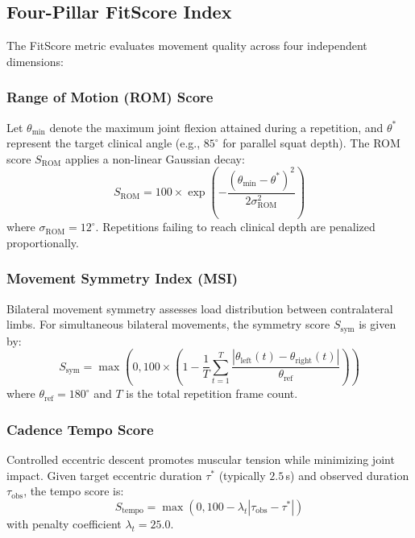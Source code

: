 \documentclass[conference]{IEEEtran}
\begin{document}
\subsection{Four-Pillar FitScore Index}
The FitScore metric evaluates movement quality across four independent dimensions:

\subsubsection{Range of Motion (ROM) Score}
Let $\theta_{\min}$ denote the maximum joint flexion attained during a repetition, and $\theta^*$ represent the target clinical angle (e.g., $85^\circ$ for parallel squat depth). The ROM score $S_{\text{ROM}}$ applies a non-linear Gaussian decay:
\begin{equation}
    S_{\text{ROM}} = 100 \times \exp\left(-\frac{(\theta_{\min} - \theta^*)^2}{2\sigma_{\text{ROM}}^2}\right)
\end{equation}
where $\sigma_{\text{ROM}} = 12^\circ$. Repetitions failing to reach clinical depth are penalized proportionally.

\subsubsection{Movement Symmetry Index (MSI)}
Bilateral movement symmetry assesses load distribution between contralateral limbs. For simultaneous bilateral movements, the symmetry score $S_{\text{sym}}$ is given by:
\begin{equation}
    S_{\text{sym}} = \max\left(0, 100 \times \left(1 - \frac{1}{T} \sum_{t=1}^T \frac{|\theta_{\text{left}}(t) - \theta_{\text{right}}(t)|}{\theta_{\text{ref}}}\right)\right)
\end{equation}
where $\theta_{\text{ref}} = 180^\circ$ and $T$ is the total repetition frame count.

\subsubsection{Cadence Tempo Score}
Controlled eccentric descent promotes muscular tension while minimizing joint impact. Given target eccentric duration $\tau^*$ (typically $2.5$\,s) and observed duration $\tau_{\text{obs}}$, the tempo score is:
\begin{equation}
    S_{\text{tempo}} = \max\left(0, 100 - \lambda_t |\tau_{\text{obs}} - \tau^*|\right)
\end{equation}
with penalty coefficient $\lambda_t = 25.0$.
\end{document}
